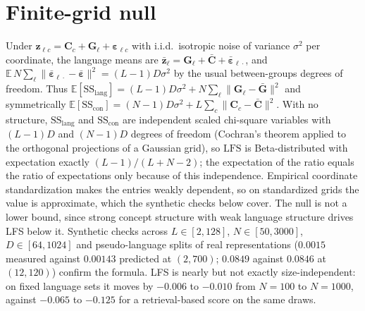 \documentclass{article} %
\def\vz{{\bm{z}}}
\newcommand{\vC}{{\bm{C}}}
\newcommand{\vG}{{\bm{G}}}
\newcommand{\veps}{{\bm{\varepsilon}}}
\newcommand{\LFS}{\mathrm{LFS}}
\newcommand{\SSl}{\mathrm{SS}_{\mathrm{lang}}}
\newcommand{\SSc}{\mathrm{SS}_{\mathrm{con}}}
\begin{document}
\section{Finite-grid null}
\label{app:null}
Under $\vz_{\ell c} = \vC_c + \vG_\ell + \veps_{\ell c}$ with
i.i.d.\ isotropic noise of variance $\sigma^2$ per coordinate, the language
means are $\bar\vz_\ell = \vG_\ell + \bar\vC + \bar{\veps}_{\ell\cdot}$,
and $\mathbb{E}\,N\sum_\ell \lVert \bar{\veps}_{\ell\cdot} -
\bar{\veps}\rVert^2 = (L-1) D \sigma^2$ by the usual
between-groups degrees of freedom. Thus
$\mathbb{E}[\SSl] = (L-1)D\sigma^2 + N\sum_\ell\lVert \vG_\ell - \bar\vG\rVert^2$
and symmetrically
$\mathbb{E}[\SSc] = (N-1)D\sigma^2 + L\sum_c\lVert \vC_c - \bar\vC\rVert^2$.
With no structure, $\SSl$ and $\SSc$ are independent scaled chi-square variables with $(L-1)D$ and $(N-1)D$ degrees of freedom (Cochran's theorem applied to the orthogonal projections of a Gaussian grid), so $\LFS$ is Beta-distributed with expectation exactly $(L-1)/(L+N-2)$; the expectation of the ratio equals the ratio of expectations only because of this independence. Empirical coordinate standardization makes the entries weakly dependent, so on standardized grids the value is approximate, which the synthetic checks below cover. The null is not a lower bound, since strong concept structure with weak language
structure drives LFS below it. Synthetic checks across
$L\in[2,128]$, $N\in[50,3000]$, $D\in[64,1024]$ and pseudo-language splits of
real representations ($0.0015$ measured against $0.00143$ predicted at
$(2,700)$; $0.0849$ against $0.0846$ at $(12,120)$) confirm the formula.
LFS is nearly but not exactly size-independent: on fixed language sets it moves by $-0.006$ to $-0.010$ from $N{=}100$ to $N{=}1000$, against $-0.065$ to $-0.125$ for a retrieval-based score on the same draws.
\end{document}

